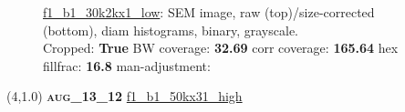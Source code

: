 \begin{figure}[h!]
\label{semimg7}
\caption*{\hyperlink{covtableaug_13_12}{\color{blue} \small \ttfamily f1\_b1\_30k2kx1\_low}: SEM image, raw (top)/size-corrected (bottom), diam histograms, binary, grayscale.\\Cropped: {\bf True} \;\; BW coverage: {\bf 32.69} \:\: corr coverage: {\bf 165.64} \:\: hex fillfrac: {\bf 16.8} \:\: man-adjustment: {\bf \color{blue}{Yes}}}
\end{figure}
\newpage

\begin{textblock}{5}(4,1.0)
{\bf \textsc{aug\_13\_12}}
\hspace{4.5cm}
\hyperlink{covtableaug_13_12}{\color{blue} \large \ttfamily f1\_b1\_50kx31\_high}
\end{textblock}

